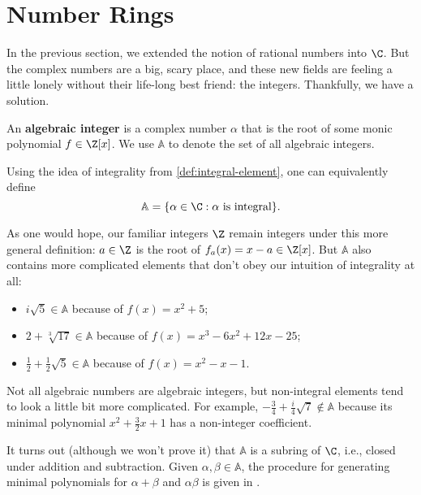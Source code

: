 \section{Number Rings}
\label{sec:number-rings}

In the previous section, we extended the notion of rational numbers into $\C$.
But the complex numbers are a big, scary place, and these new fields are feeling a little lonely without their life-long best friend: the integers.
Thankfully, we have a solution.

\begin{definition}
    An \textbf{algebraic integer} is a complex number $\alpha$ that is the root of some monic polynomial $f \in \Z[x]$. We use $\mathbb A$ to denote the set of all algebraic integers.

    Using the idea of integrality from \autoref{def:integral-element}, one can equivalently define
    \begin{equation}
        \mathbb A = \{ \alpha \in \C : \text{$\alpha$ is integral} \}.
    \end{equation}
\end{definition}

As one would hope, our familiar integers $\Z$ remain integers under this more general definition: $a \in \Z$ is the root of $f_a(x) = x - a \in \Z[x]$. But $\mathbb A$ also contains more complicated elements that don't obey our intuition of integrality at all:
\begin{itemize}
    \item $i \sqrt 5 \in \mathbb A$ because of $f(x) = x^2 + 5$;
    \item $2 + \sqrt[3]{17} \in \mathbb A$ because of $f(x) = x^3 - 6 x^2 + 12 x - 25$;
    \item $\frac12 + \frac12 \sqrt 5 \in \mathbb A$ because of $f(x) = x^2 - x - 1$.
\end{itemize}
Not all algebraic numbers are algebraic integers, but non-integral elements tend to look a little bit more complicated. For example, $- \frac 3 4 + \frac i 4 \sqrt 7 \not \in \mathbb A$ because its minimal polynomial $x^2 + \frac32x + 1$ has a non-integer coefficient.

It turns out (although we won't prove it) that $\mathbb A$ is a subring of $\C$, i.e., closed under addition and subtraction. Given $\alpha, \beta \in \mathbb A$, the procedure for generating minimal polynomials for $\alpha + \beta$ and $\alpha \beta$ is given in \textcite[12]{marcus}.


